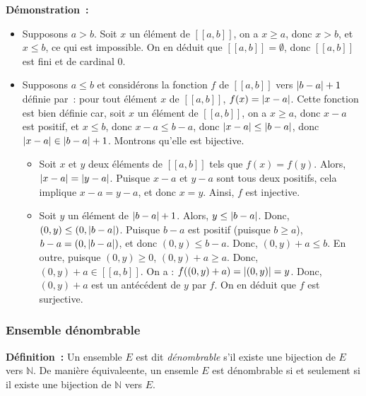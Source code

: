 \noindent\textbf{Démonstration :}
    \begin{itemize}[nosep]
        \item Supposons $a > b$. 
            Soit $x$ un élément de $[\![a,b]\!]$, on a $x \geq a$, donc $x > b$, et $x \leq b$, ce qui est impossible.
            On en déduit que $[\![a, b]\!] = \emptyset$, donc $[\![a, b]\!]$ est fini et de cardinal $0$.
        \item Supposons $a \leq b$ et considérons la fonction $f$ de $[\![a, b]\!]$ vers $\left\lvert b-a \right\rvert+1$ définie par : pour tout élément $x$ de $[\![a, b]\!]$, $f(x) = \left\lvert x - a \right\rvert$. 
            Cette fonction est bien définie car, soit $x$ un élément de $[\![a, b]\!]$, on a $x \geq a$, donc $x - a$ est positif, et $x \leq b$, donc $x - a \leq b - a$, donc $\left\lvert x-a \right\rvert \leq \left\lvert b-a \right\rvert$, donc $\left\lvert x-a \right\rvert \in \left\lvert b-a \right\rvert + 1$. 
            Montrons qu'elle est bijective.
            \begin{itemize}[nosep]
                \item Soit $x$ et $y$ deux éléments de $[\![a, b]\!]$ tels que $f(x) = f(y)$.
                    Alors, $\left\lvert x-a \right\rvert = \left\lvert y-a \right\rvert$. 
                    Puisque $x-a$ et $y-a$ sont tous deux positifs, cela implique $x - a = y - a$, et donc $x = y$.
                    Ainsi, $f$ est injective.
                \item Soit $y$ un élément de $\left\lvert b-a \right\rvert+1$. 
                    Alors, $y \leq \left\lvert b-a \right\rvert$. 
                    Donc, $(0,y) \leq (0, \left\lvert b-a \right\rvert)$. 
                    Puisque $b-a$ est positif (puisque $b \geq a$), $b - a = (0, \left\lvert b-a \right\rvert)$, et donc $(0, y) \leq b-a$.
                    Donc, $(0, y) + a \leq b$.
                    En outre, puisque $(0,y) \geq 0$, $(0,y) + a \geq a$.
                    Donc, $(0,y)+a \in [\![a,b]\!]$.
                    On a  : $f((0,y)+a) = \left\lvert (0,y) \right\rvert = y$. 
                    Donc, $(0,y)+a$ est un antécédent de $y$ par $f$. 
                    On en déduit que $f$ est surjective.
            \end{itemize}
    \end{itemize}

    \hfill \square

\subsubsection{Ensemble dénombrable}
\label{subsub:dénombrable}

\noindent\textbf{Définition :} Un ensemble $E$ est dit \textit{dénombrable} s'il existe une bijection de $E$ vers $\mathbb{N}$. 
    De manière équivaleente, un ensemle $E$ est dénombrable si et seulement si il existe une bijection de $\mathbb{N}$ vers $E$.

